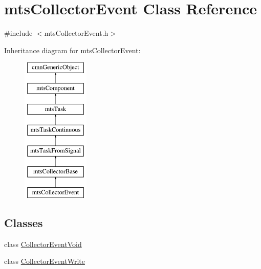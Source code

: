 \hypertarget{classmts_collector_event}{\section{mts\-Collector\-Event Class Reference}
\label{classmts_collector_event}
}


{\ttfamily \#include $<$mts\-Collector\-Event.\-h$>$}

Inheritance diagram for mts\-Collector\-Event\-:\begin{figure}[H]
\begin{center}
\leavevmode
\includegraphics[height=7.000000cm]{d5/dba/classmts_collector_event}
\end{center}
\end{figure}
\subsection*{Classes}
\begin{DoxyCompactItemize}
\item 
class \hyperlink{classmts_collector_event_1_1_collector_event_void}{Collector\-Event\-Void}
\item 
class \hyperlink{classmts_collector_event_1_1_collector_event_write}{Collector\-Event\-Write}
\end{DoxyCompactItemize}

